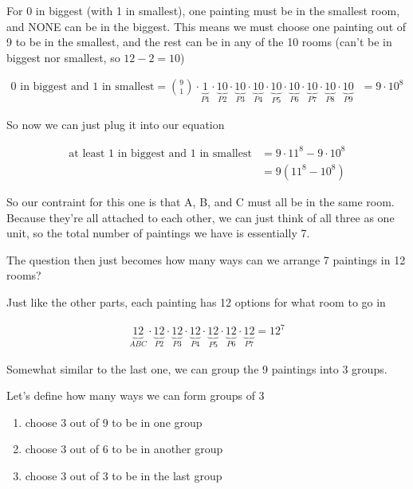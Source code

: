 \documentclass[../Main.tex]{subfiles}
\begin{document}
\begin{alphabet}
{        For 0 in biggest (with 1 in smallest), one painting must be in the smallest room, and NONE can be in the biggest.
        This means we must choose one painting out of 9 to be in the smallest, and the rest can be in any of the 10 rooms (can't be in biggest nor smallest, so $12 - 2 = 10$)

        \begin{align*}
            \text{0 in biggest and 1 in smallest} = {9 \choose 1} \cdot \underbrace{1}_{P1} \cdot \underbrace{10}_{P2} \cdot \underbrace{10}_{P3} \cdot \underbrace{10}_{P4} \cdot \underbrace{10}_{P5} \cdot \underbrace{10}_{P6} \cdot \underbrace{10}_{P7} \cdot \underbrace{10}_{P8} \cdot \underbrace{10}_{P9} &= 9 \cdot 10^8
        \end{align*}

        So now we can just plug it into our equation

        \begin{align*}
            \text{at least 1 in biggest and 1 in smallest} &= 9 \cdot 11^8 - 9 \cdot 10^8 \\
            &= \boxed{9(11^8 - 10^8)}
        \end{align*}
    }

    \item
    {
        So our contraint for this one is that A, B, and C must all be in the same room. Because they're all attached to each other, we can just think
        of all three as one unit, so the total number of paintings we have is essentially 7.

        The question then just becomes how many ways can we arrange 7 paintings in 12 rooms?

        Just like the other parts, each painting has 12 options for what room to go in

        \begin{align*}
            \underbrace{12}_{ABC} \cdot \underbrace{12}_{P2} \cdot \underbrace{12}_{P3} \cdot \underbrace{12}_{P4} \cdot \underbrace{12}_{P5} \cdot \underbrace{12}_{P6} \cdot \underbrace{12}_{P7} = \boxed{12^7}
        \end{align*}
    }

    \item
    {
        Somewhat similar to the last one, we can group the 9 paintings into 3 groups.

        Let's define how many ways we can form groups of 3

        \begin{enumerate}
            \item choose 3 out of 9 to be in one group
            \item choose 3 out of 6 to be in another group
            \item choose 3 out of 3 to be in the last group
        \end{enumerate}

}
\end{alphabet}
\end{document}
